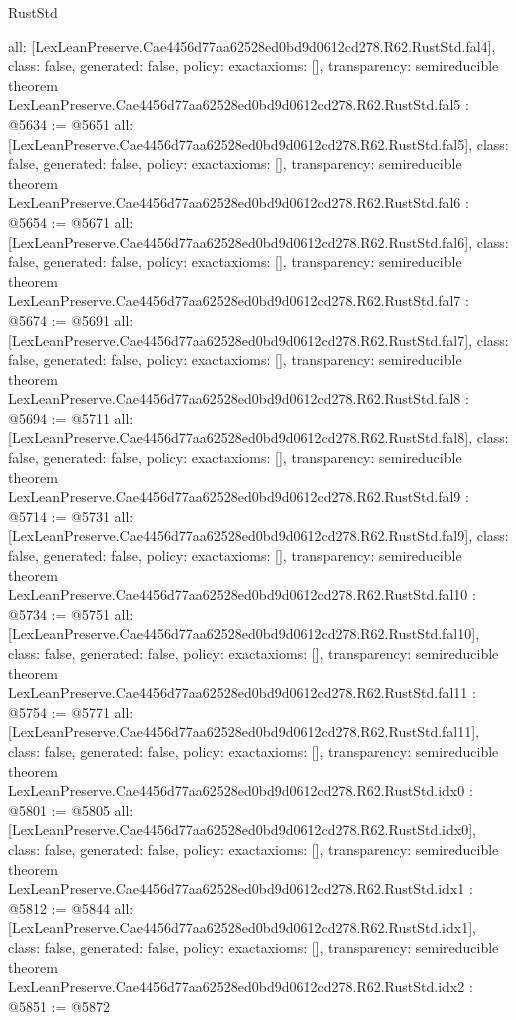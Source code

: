 \begin{lexlean}{RustStd}
\begin{coremodule}
{  all: [LexLeanPreserve.Cae4456d77aa62528ed0bd9d0612cd278.R62.RustStd.fal4],
  class: false,
  generated: false,
  policy: exact{axioms: []},
  transparency: semireducible
}
theorem LexLeanPreserve.Cae4456d77aa62528ed0bd9d0612cd278.R62.RustStd.fal5 : @5634 := @5651 {
  all: [LexLeanPreserve.Cae4456d77aa62528ed0bd9d0612cd278.R62.RustStd.fal5],
  class: false,
  generated: false,
  policy: exact{axioms: []},
  transparency: semireducible
}
theorem LexLeanPreserve.Cae4456d77aa62528ed0bd9d0612cd278.R62.RustStd.fal6 : @5654 := @5671 {
  all: [LexLeanPreserve.Cae4456d77aa62528ed0bd9d0612cd278.R62.RustStd.fal6],
  class: false,
  generated: false,
  policy: exact{axioms: []},
  transparency: semireducible
}
theorem LexLeanPreserve.Cae4456d77aa62528ed0bd9d0612cd278.R62.RustStd.fal7 : @5674 := @5691 {
  all: [LexLeanPreserve.Cae4456d77aa62528ed0bd9d0612cd278.R62.RustStd.fal7],
  class: false,
  generated: false,
  policy: exact{axioms: []},
  transparency: semireducible
}
theorem LexLeanPreserve.Cae4456d77aa62528ed0bd9d0612cd278.R62.RustStd.fal8 : @5694 := @5711 {
  all: [LexLeanPreserve.Cae4456d77aa62528ed0bd9d0612cd278.R62.RustStd.fal8],
  class: false,
  generated: false,
  policy: exact{axioms: []},
  transparency: semireducible
}
theorem LexLeanPreserve.Cae4456d77aa62528ed0bd9d0612cd278.R62.RustStd.fal9 : @5714 := @5731 {
  all: [LexLeanPreserve.Cae4456d77aa62528ed0bd9d0612cd278.R62.RustStd.fal9],
  class: false,
  generated: false,
  policy: exact{axioms: []},
  transparency: semireducible
}
theorem LexLeanPreserve.Cae4456d77aa62528ed0bd9d0612cd278.R62.RustStd.fal10 : @5734 := @5751 {
  all: [LexLeanPreserve.Cae4456d77aa62528ed0bd9d0612cd278.R62.RustStd.fal10],
  class: false,
  generated: false,
  policy: exact{axioms: []},
  transparency: semireducible
}
theorem LexLeanPreserve.Cae4456d77aa62528ed0bd9d0612cd278.R62.RustStd.fal11 : @5754 := @5771 {
  all: [LexLeanPreserve.Cae4456d77aa62528ed0bd9d0612cd278.R62.RustStd.fal11],
  class: false,
  generated: false,
  policy: exact{axioms: []},
  transparency: semireducible
}
theorem LexLeanPreserve.Cae4456d77aa62528ed0bd9d0612cd278.R62.RustStd.idx0 : @5801 := @5805 {
  all: [LexLeanPreserve.Cae4456d77aa62528ed0bd9d0612cd278.R62.RustStd.idx0],
  class: false,
  generated: false,
  policy: exact{axioms: []},
  transparency: semireducible
}
theorem LexLeanPreserve.Cae4456d77aa62528ed0bd9d0612cd278.R62.RustStd.idx1 : @5812 := @5844 {
  all: [LexLeanPreserve.Cae4456d77aa62528ed0bd9d0612cd278.R62.RustStd.idx1],
  class: false,
  generated: false,
  policy: exact{axioms: []},
  transparency: semireducible
}
theorem LexLeanPreserve.Cae4456d77aa62528ed0bd9d0612cd278.R62.RustStd.idx2 : @5851 := @5872 {
}
\end{coremodule}
\end{lexlean}
